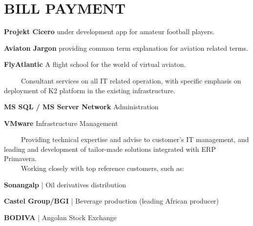 \documentclass[letterpaper]{deedy-resume} %
\begin{document}
\begin{minipage}[t]{0.66\textwidth}

\section{BILL PAYMENT}


\vspace{\topsep}
\begin{tightitemize}
	\item \textbf{Projekt Cicero} under development app for amateur football players.
	\item \textbf{Aviaton Jargon} providing common term explanation for aviation related terms.
	\item \textbf{FlyAtlantic} A flight school for the world of virtual aviaton.
\end{tightitemize}


\sectionspace


\-\	\ \ \ \ Consultant services on all IT related operation, with specific emphasis on deployment of K2 platform in the existing infrastructure. \\

\begin{tightitemize}
	\item \textbf{MS SQL / MS Server Network} Administration
	\item \textbf{VMware} Infrastructure Management
\end{tightitemize}

\sectionspace


\-\	\ \ \ \ Providing technical expertise and advise to customer's IT management, and leading and development of tailor-made solutions integrated with ERP Primavera.\\
\-\	\ \ \ \ Working closely with top reference customers, such as:\\
\begin{tightitemize}
	\item \textbf{Sonangalp} | Oil derivatives distribution
	\item \textbf{Castel Group/BGI} | Beverage production (leading African producer)
	\item \textbf{BODIVA} | Angolan Stock Exchange
\end{tightitemize}


\end{minipage}
\end{document}
